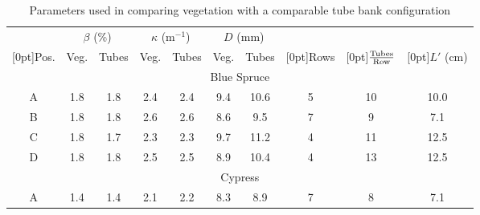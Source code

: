 \documentclass[12pt]{article}
\newcommand*\textfrac[2]{
  \frac{{#1}}{{#2}}
}
\begin{document}
\begin{table}[!]
    \centering
    \caption{Parameters used in comparing vegetation with a comparable tube bank configuration}
    \label{tab:tube_parameters}
    \begin{tabular}{|c|c|c|c|c|c|c|c|c|c|}
    \hline
                                 & \multicolumn{2}{|c|}{$\beta$ (\%)} & \multicolumn{2}{|c|}{$\kappa$ (m$^{-1}$)} & \multicolumn{2}{|c|}{$D$ (mm)} &                             &                         &         \\ \cline{2-7}
    \raisebox{1.5ex}[0pt]{Pos.}  & Veg.             & Tubes      & Veg.                 & Tubes              & Veg.              & Tubes      & \raisebox{1.5ex}[0pt]{Rows} & \raisebox{1.5ex}[0pt]{$\textfrac{\rm{Tubes}}{\rm{Row}}$} &\raisebox{1.5ex}[0pt]{$L'$ (cm)}\\ \hline \hline
    \multicolumn{10}{|c|}{Blue Spruce}                                                                                                                                                    \\ \hline
    A                            & 1.8            & 1.8      & 2.4                  & 2.4                & 9.4               & 10.6        & 5                           & 10           &          10.0           \\ \hline
    B                            & 1.8            &1.8     & 2.6                & 2.6               &8.6               & 9.5       & 7                           & 9                      &         7.1  \\ \hline
    C                            & 1.8            & 1.7      & 2.3                  & 2.3                & 9.7               & 11.2       &4                            & 11            &      12.5             \\ \hline
    D                            & 1.8           & 1.8      & 2.5                 & 2.5               & 8.9             & 10.4       & 4                           & 13                 &  12.5             \\ \hline
        \multicolumn{10}{|c|}{Cypress}                                                                                                                                                    \\ \hline
    A                            &1.4           & 1.4      & 2.1                  & 2.2                & 8.3              & 8.9       & 7                           & 8                 &   7.1         \\ \hline

\end{tabular}
\end{table}
\end{document}
